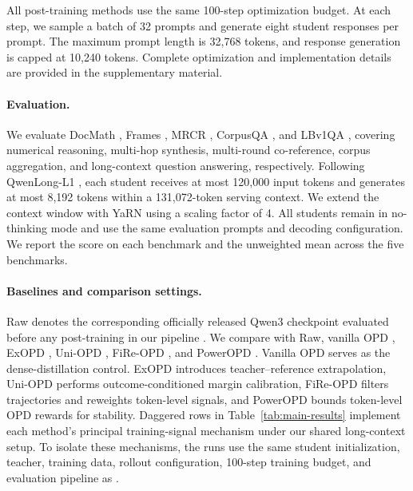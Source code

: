 All post-training methods use the same 100-step optimization budget. At each step, we sample a batch of 32 prompts and generate eight student responses per prompt. The maximum prompt length is 32{,}768 tokens, and response generation is capped at 10{,}240 tokens. Complete optimization and implementation details are provided in the supplementary material.

\paragraph{Evaluation.}

We evaluate DocMath \citep{zhao2024docmath}, Frames \citep{krishna2025fact}, MRCR \citep{vodrahalli2024michelangelo}, CorpusQA \citep{lu2026corpusqa}, and LBv1QA \citep{bai2024longbench}, covering numerical reasoning, multi-hop synthesis, multi-round co-reference, corpus aggregation, and long-context question answering, respectively. Following QwenLong-L1 \citep{wan2025qwenlong}, each student receives at most 120{,}000 input tokens and generates at most 8{,}192 tokens within a 131{,}072-token serving context. We extend the context window with YaRN \citep{peng2024yarn} using a scaling factor of 4. All students remain in no-thinking mode and use the same evaluation prompts and decoding configuration. We report the score on each benchmark and the unweighted mean across the five benchmarks.

\paragraph{Baselines and comparison settings.}

Raw denotes the corresponding officially released Qwen3 checkpoint evaluated before any post-training in our pipeline \citep{yang2025qwen3}. We compare \method{} with Raw, vanilla OPD \citep{agarwal2024policy}, ExOPD \citep{yang2026learning}, Uni-OPD \citep{hou2026uni}, FiRe-OPD \citep{li2026filter}, and PowerOPD \citep{zhao2026poweropd}. Vanilla OPD serves as the dense-distillation control. ExOPD introduces teacher--reference extrapolation, Uni-OPD performs outcome-conditioned margin calibration, FiRe-OPD filters trajectories and reweights token-level signals, and PowerOPD bounds token-level OPD rewards for stability. Daggered rows in Table~\ref{tab:main-results} implement each method's principal training-signal mechanism under our shared long-context setup. To isolate these mechanisms, the runs use the same student initialization, teacher, training data, rollout configuration, 100-step training budget, and evaluation pipeline as \method{}.

